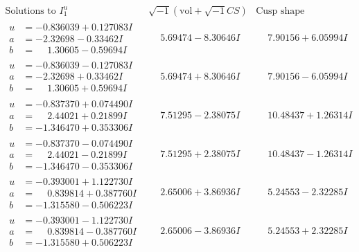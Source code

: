 \documentclass[1p]{elsarticle_modified}
\theoremstyle{definition}
\newcommand{\I}{\sqrt{-1}}
\begin{document}
$$\begin{array}{c|c|c}  
\text{Solutions to }I^u_{1}& \I (\text{vol} + \sqrt{-1}CS) & \text{Cusp shape}\\
 \hline 
\begin{aligned}
u &= -0.836039 + 0.127083 I \\
a &= -2.32698 - 0.33462 I \\
b &= \phantom{-}1.30605 - 0.59694 I\end{aligned}
 & \phantom{-}5.69474 - 8.30646 I & \phantom{-}7.90156 + 6.05994 I \\ \hline\begin{aligned}
u &= -0.836039 - 0.127083 I \\
a &= -2.32698 + 0.33462 I \\
b &= \phantom{-}1.30605 + 0.59694 I\end{aligned}
 & \phantom{-}5.69474 + 8.30646 I & \phantom{-}7.90156 - 6.05994 I \\ \hline\begin{aligned}
u &= -0.837370 + 0.074490 I \\
a &= \phantom{-}2.44021 + 0.21899 I \\
b &= -1.346470 + 0.353306 I\end{aligned}
 & \phantom{-}7.51295 - 2.38075 I & \phantom{-}10.48437 + 1.26314 I \\ \hline\begin{aligned}
u &= -0.837370 - 0.074490 I \\
a &= \phantom{-}2.44021 - 0.21899 I \\
b &= -1.346470 - 0.353306 I\end{aligned}
 & \phantom{-}7.51295 + 2.38075 I & \phantom{-}10.48437 - 1.26314 I \\ \hline\begin{aligned}
u &= -0.393001 + 1.122730 I \\
a &= \phantom{-}0.839814 + 0.387760 I \\
b &= -1.315580 - 0.506223 I\end{aligned}
 & \phantom{-}2.65006 + 3.86936 I & \phantom{-}5.24553 - 2.32285 I \\ \hline\begin{aligned}
u &= -0.393001 - 1.122730 I \\
a &= \phantom{-}0.839814 - 0.387760 I \\
b &= -1.315580 + 0.506223 I\end{aligned}
 & \phantom{-}2.65006 - 3.86936 I & \phantom{-}5.24553 + 2.32285 I \\ \hline\begin{aligned}

\end{aligned}
\end{array}$$
\end{document}
